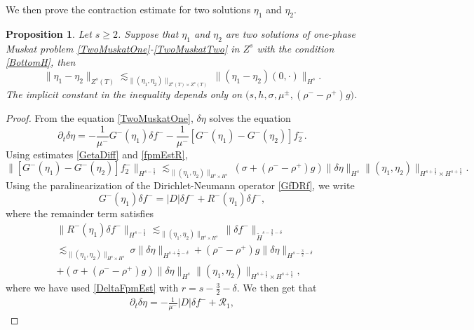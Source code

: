 \documentclass[12pt]{amsart}
\newtheorem{proposition}[theorem]{Proposition}
\theoremstyle{definition}
\numberwithin{equation}{section}
\newcommand{\p}{\partial}
\newcommand{\f}{\frac}
\begin{document}
We then prove the contraction estimate for two solutions $\eta_1$ and $\eta_2$.
\begin{proposition} \label{t:propConTwo}
Let $s\geq 2$.
Suppose that $\eta_1$ and $\eta_2$ are two solutions of one-phase Muskat problem \eqref{TwoMuskatOne}-\eqref{TwoMuskatTwo} in $Z^s$ with the condition \eqref{BottomH}, then
\begin{equation*} %
 \|\eta_1 - \eta_2\|_{Z^s(T)} \lesssim_{\|(\eta_1, \eta_2)\|_{Z^s(T) \times Z^s(T)}} \|(\eta_1 - \eta_2)(0,\cdot) \|_{H^s}.
\end{equation*}
The implicit constant in the inequality depends only on $\big(s,h, \sigma, \mu^\pm, (\rho^- -\rho^+)g\big)$.
\end{proposition}

\begin{proof}
From the equation \eqref{TwoMuskatOne}, $\delta \eta$ solves the equation
\begin{equation*}
\p_t \delta\eta = -\f{1}{\mu^-}G^-(\eta_1)\delta f^- - \f{1}{\mu^-}[G^-(\eta_1) - G^-(\eta_2)]f_2^-.
\end{equation*}
Using estimates \eqref{GetaDiff} and \eqref{fpmEstR},
\begin{equation*}
 \|[G^-(\eta_1) - G^-(\eta_2)]f_2^- \|_{H^{s-\f52}} \lesssim_{\|(\eta_1, \eta_2)\|_{H^s \times H^s}} (\sigma + (\rho^- -\rho^+)g)\|\delta \eta\|_{H^s} \|(\eta_1, \eta_2)\|_{H^{s+\f52}\times H^{s+\f52}}.
\end{equation*}
Using the paralinearization of the Dirichlet-Neumann operator \eqref{GfDRf}, we write
\begin{equation*}
    G^-(\eta_1) \delta f^- = |D|\delta f^- + R^-(\eta_1)\delta f^-,
\end{equation*}
where the remainder term satisfies
\begin{align*}
 &\|R^-(\eta_1)\delta f^- \|_{H^{s-\f52}}\lesssim_{\|(\eta_1, \eta_2)\|_{H^s \times H^s}}\|\delta f^-\|_{\tilde{H}^{s-\f32-\delta}}\\
 &\lesssim_{\|(\eta_1, \eta_2)\|_{H^s\times H^s}} \sigma \|\delta \eta \|_{H^{s+\f52-\delta}}+ (\rho^- -\rho^+)g \|\delta \eta\|_{H^{s-\f32-\delta}}\\
 &+ (\sigma + (\rho^- -\rho^+)g)\|\delta \eta\|_{H^s} \|(\eta_1, \eta_2)\|_{H^{s+\f52}\times H^{s+\f52}},
\end{align*}
where we have used \eqref{DeltaFpmEst} with $r=s-\f32-\delta$.
We then get that
\begin{align*}
\p_t\delta\eta=-\f{1}{\mu^-}|D|\delta f^-+\mathcal{R}_1,

\end{align*}
\end{proof}
\end{document}
